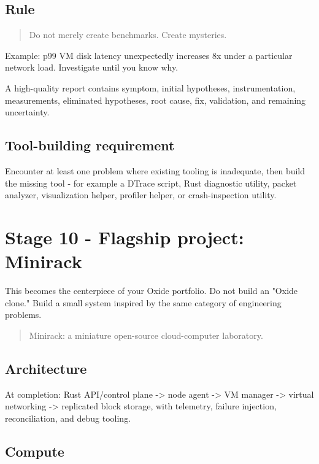 \documentclass[11pt,letterpaper]{article}
\begin{document}
\subsection*{Rule}

\begin{quote}
Do not merely create benchmarks. Create mysteries.
\end{quote}

Example: p99 VM disk latency unexpectedly increases 8x under a particular network load. Investigate until you know why.

A high-quality report contains symptom, initial hypotheses, instrumentation, measurements, eliminated hypotheses, root cause, fix, validation, and remaining uncertainty.

\subsection*{Tool-building requirement}

Encounter at least one problem where existing tooling is inadequate, then build the missing tool - for example a DTrace script, Rust diagnostic utility, packet analyzer, visualization helper, profiler helper, or crash-inspection utility.

\section{Stage 10 - Flagship project: Minirack}\label{sec:14}

\label{stage:10}

This becomes the centerpiece of your Oxide portfolio. Do not build an "Oxide clone." Build a small system inspired by the same category of engineering problems.

\begin{quote}
Minirack: a miniature open-source cloud-computer laboratory.
\end{quote}

\subsection*{Architecture}

At completion: Rust API/control plane -> node agent -> VM manager -> virtual networking -> replicated block storage, with telemetry, failure injection, reconciliation, and debug tooling.

\subsection*{Compute}
\end{document}
